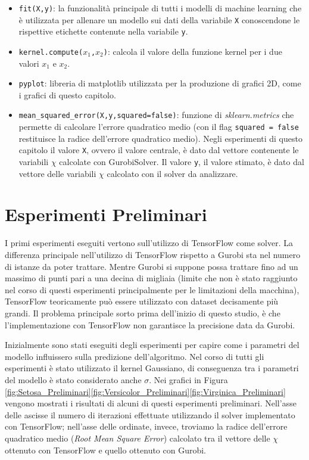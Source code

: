 \documentclass[a4paper,12pt]{report}
\begin{document}
\begin{itemize}
    \item \texttt{fit(X,y)}: la funzionalità principale di tutti i modelli di machine learning che è utilizzata per allenare un modello sui dati della variabile \texttt{X} conoscendone le rispettive etichette contenute nella variabile \texttt{y}.
    \item \texttt{kernel.compute($x_{1}$,$x_{2}$)}: calcola il valore della funzione kernel per i due valori $x_{1}$ e $x_{2}$.
    \item \texttt{pyplot}: libreria di matplotlib utilizzata per la produzione di grafici 2D, come i grafici di questo capitolo.
    \item \texttt{mean\_squared\_error(X,y,squared=false)}: funzione di \textit{sklearn.metrics} che permette di calcolare l'errore quadratico medio (con il flag \texttt{squared = false} restituisce la radice dell'errore quadratico medio). Negli esperimenti di questo capitolo il valore \texttt{X}, ovvero il valore centrale, è dato dal vettore contenente le variabili $\chi$ calcolate con GurobiSolver. Il valore \texttt{y}, il valore stimato, è dato dal vettore delle variabili $\chi$ calcolato con il solver da analizzare.
\end{itemize}

\section{Esperimenti Preliminari}
I primi esperimenti eseguiti vertono sull'utilizzo di TensorFlow come solver. La differenza principale nell'utilizzo di TensorFlow rispetto a Gurobi sta nel numero di istanze da poter trattare. Mentre Gurobi si suppone possa trattare fino ad un massimo di punti pari a una decina di migliaia (limite che non è stato raggiunto nel corso di questi esperimenti principalmente per le limitazioni della macchina), TensorFlow teoricamente può essere utilizzato con dataset decisamente più grandi. Il problema principale sorto prima dell'inizio di questo studio, è che l'implementazione con TensorFlow non garantisce la precisione data da Gurobi.

Inizialmente sono stati eseguiti degli esperimenti per capire come i parametri del modello influissero sulla predizione dell'algoritmo. Nel corso di tutti gli esperimenti è stato utilizzato il kernel Gaussiano, di conseguenza tra i parametri del modello è stato considerato anche $\sigma$. Nei grafici in Figura \ref{fig:Setosa_Preliminari}\ref{fig:Versicolor_Preliminari}\ref{fig:Virginica_Preliminari} vengono mostrati i risultati di alcuni di questi esperimenti preliminari. Nell'asse delle ascisse il numero di iterazioni effettuate utilizzando il solver implementato con TensorFlow; nell'asse delle ordinate, invece, troviamo la radice dell'errore quadratico medio (\textit{Root Mean Square Error}) calcolato tra il vettore delle $\chi$ ottenuto con TensorFlow e quello ottenuto con Gurobi.
\end{document}
